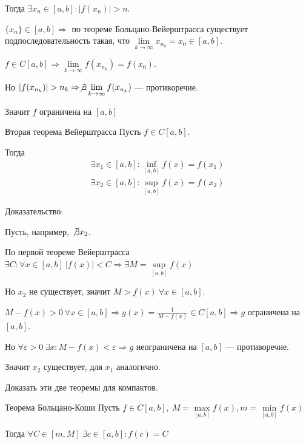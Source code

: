 Тогда \( \exists x_n \in [a, b] : |f(x_n)| > n \).

\( \{ x_n \} \in [a, b] \Rightarrow \) 
по теореме Больцано-Вейерштрасса существует подпоследовательность такая, что
\( \lim\limits_{k \to \infty} x_{n_k} = x_0 \in [a, b] \).

\( f \in C[a, b] \Rightarrow \lim\limits_{k \to \infty} f(x_{n_k}) = f(x_0) \).

Но \( |f(x_{n_k})| > n_k \Rightarrow \not\exists \lim\limits_{k \to \infty} f(x_{n_k}) \) --- противоречие.

Значит \( f \) ограничена на \( [a, b] \)

\begin{thrm}{Вторая теорема Вейерштрасса}{}
    Пусть \( f \in C[a, b] \).

    Тогда
    \begin{gather*}
        \exists x_1 \in [a, b] : \inf\limits_{[a, b]} f(x) = f(x_1)
        \\
        \exists x_2 \in [a, b] : \sup\limits_{[a, b]} f(x) = f(x_2)
    \end{gather*}
\end{thrm}

Доказательство:

Пусть, например, \( \not\exists x_2 \).

По первой теореме Вейерштрасса 
\( \exists C : \forall x \in [a, b] \ |f(x)| < C \Rightarrow \exists M = \sup\limits_{[a, b]} f(x) \)

Но \( x_2 \) не существует, значит \( M > f(x) \ \forall x \in [a, b] \).

\( M - f(x) > 0 \ \forall x \in [a, b] \Rightarrow g(x) = \frac{1}{M - f(x)} \in C[a, b] \Rightarrow g \) 
ограничена на \( [a, b] \).

Но \( \forall \varepsilon > 0 \ \exists x : M - f(x) < \varepsilon \Rightarrow g \) 
неограничена на \( [a, b] \) --- противоречие.

Значит \( x_2 \) существует, для \( x_1 \) аналогично.

\begin{exercise}{}{}
    Доказать эти две теоремы для компактов.
\end{exercise}

\begin{thrm}{Теорема Больцано-Коши}{}
    Пусть \( f \in C[a, b], \ M = \max\limits_{[a, b]} f(x), m = \min\limits_{[a, b]} f(x) \)

    Тогда \( \forall C \in [m, M] \ \exists c \in [a, b] : f(c) = C \)
\end{thrm}


